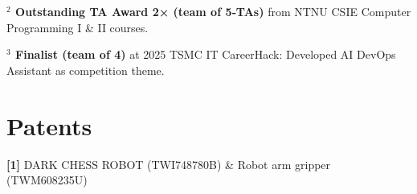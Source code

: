 \documentclass[a4paper,11pt]{article}
\begin{document}
\noindent \hypertarget{award2}{\label{award2}} \textbf{\raisebox{0pt}{}$^{2}$ Outstanding TA Award 2× (team of 5‑TAs)} from NTNU CSIE Computer Programming I \& II courses.

\noindent \hypertarget{award3}{\label{award3}} \textbf{\raisebox{0pt}{}$^{3}$ Finalist (team of 4)} at 2025 TSMC IT CareerHack: Developed AI DevOps Assistant as competition theme.

\section{Patents}
\noindent \hypertarget{patent1}{\label{patent1}} \textbf{[1]} DARK CHESS ROBOT (TWI748780B) \& Robot arm gripper (TWM608235U)
\end{document}
